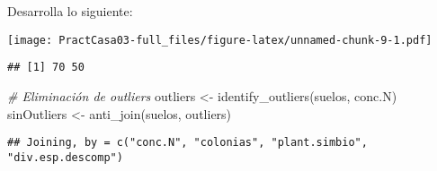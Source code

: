 \documentclass[
]{article}
\newenvironment{Shaded}{}{}
\newcommand{\CommentTok}[1]{\textcolor[rgb]{0.38,0.63,0.69}{\textit{#1}}}
\newcommand{\FunctionTok}[1]{\textcolor[rgb]{0.02,0.16,0.49}{#1}}
\newcommand{\NormalTok}[1]{#1}
\newcommand{\OtherTok}[1]{\textcolor[rgb]{0.00,0.44,0.13}{#1}}
\newcommand{\SpecialCharTok}[1]{\textcolor[rgb]{0.25,0.44,0.63}{#1}}
\newcommand{\StringTok}[1]{\textcolor[rgb]{0.25,0.44,0.63}{#1}}
\begin{document}
Desarrolla lo siguiente:

\begin{Shaded}
\end{Shaded}

\texttt{[image: PractCasa03-full\_files/figure-latex/unnamed-chunk-9-1.pdf]}

\begin{Shaded}
\end{Shaded}

\begin{verbatim}
## [1] 70 50
\end{verbatim}

\begin{Shaded}
\begin{Highlighting}[]
\CommentTok{\# Eliminación de outliers}
\NormalTok{outliers  }\OtherTok{\textless{}{-}} \FunctionTok{identify\_outliers}\NormalTok{(suelos, conc.N)}
\NormalTok{sinOutliers }\OtherTok{\textless{}{-}} \FunctionTok{anti\_join}\NormalTok{(suelos, outliers) }
\end{Highlighting}
\end{Shaded}

\begin{verbatim}
## Joining, by = c("conc.N", "colonias", "plant.simbio", "div.esp.descomp")
\end{verbatim}

\begin{Shaded}
\end{Shaded}
\end{document}
